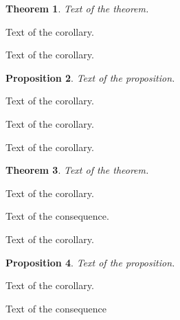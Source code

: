 \documentclass{article}
\newtheorem{theorem}{Theorem}[section]
\newtheorem{proposition}[theorem]{Proposition}
\begin{document}
\begin{theorem}
	Text of the theorem.
\end{theorem}

\begin{corollary}
	Text of the corollary.
\end{corollary}

\begin{corollary}
	Text of the corollary.
\end{corollary}

\begin{proposition}
	Text of the proposition.
\end{proposition}

\begin{corollary}
	Text of the corollary.
\end{corollary}

\begin{corollary}
	Text of the corollary.
\end{corollary}

\begin{corollary}
	Text of the corollary.
\end{corollary}

\begin{theorem}
	Text of the theorem.
\end{theorem}

\begin{corollary}
	Text of the corollary.
\end{corollary}

\begin{consequence}
	Text of the consequence.
\end{consequence}

\begin{corollary}
	Text of the corollary.
\end{corollary}

\begin{proposition}
	Text of the proposition.
\end{proposition}

\begin{corollary}
	Text of the corollary.
\end{corollary}

\begin{consequence}
	Text of the consequence
\end{consequence}
\end{document}
